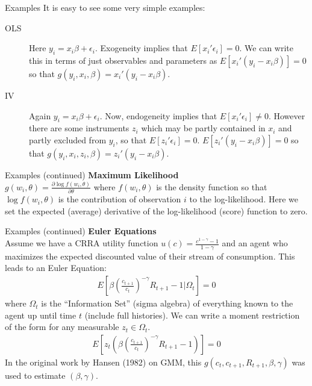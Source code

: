 \documentclass[aspectratio=169]{beamer}
\begin{document}
\begin{frame}{Examples}
It is easy to see some very simple examples:
\begin{description} 
\item[OLS] Here $y_i = x_i \beta + \epsilon_i$. Exogeneity implies that $E[x_i' \epsilon_i]=0$. We can write this in terms of just observables and parameters as $E[x_i' (y_i - x_i \beta)]=0$ so that $g(y_i,x_i, \beta) = x_i' (y_i - x_i \beta)$.
\item[IV]  Again $y_i = x_i \beta + \epsilon_i$. Now, endogeneity implies that $E[x_i' \epsilon_i]\neq0$. However there are some instruments $z_i$ which may be partly contained in $x_i$ and partly excluded from $y_i$, so that $E[z_i' \epsilon_i]=0$. $E[z_i' (y_i - x_i \beta)]=0$ so that $g(y_i,x_i,z_i, \beta) = z_i' (y_i - x_i \beta)$.
\end{description}
\end{frame}

\begin{frame}{Examples (continued)}
\textbf{Maximum Likelihood}\\
 $g(w_i,\theta) =  \frac{\partial \log f(w_i,\theta)}{\partial \theta}$ where $f(w_i,\theta)$ is the density function so that $\log f(w_i,\theta)$ is the contribution of observation $i$ to the log-likelihood. Here we set the expected (average) derivative of the log-likelihood (score) function to zero.
\end{frame}


\begin{frame}{Examples (continued)}
\textbf{Euler Equations}\\
Assume we have a CRRA utility function $u(c) = \frac{c^{1-\gamma} -1}{1-\gamma}$ and an agent who maximizes the expected discounted value of their stream of consumption. This leads to an Euler Equation:
\begin{eqnarray*}
E \left[\beta \left( \frac{c_{t+1}}{c_t} \right)^{-\gamma} R_{t+1} -1 | \Omega_t \right] =0
\end{eqnarray*}
where $\Omega_t$ is the ``Information Set'' (sigma algebra) of everything known to the agent up until time $t$ (include full histories). We can write a moment restriction of the form for any measurable $z_t \in \Omega_t$.
\begin{eqnarray*}
E \left[z_t \left(\beta  \left( \frac{c_{t+1}}{c_t} \right)^{-\gamma} R_{t+1} -1\right) \right] =0
\end{eqnarray*}
In the original work by Hansen (1982) on GMM, this $g(c_t,c_{t+1},R_{t+1},\beta,\gamma)$ was used to estimate $(\beta,\gamma)$.
\end{frame}
\end{document}

